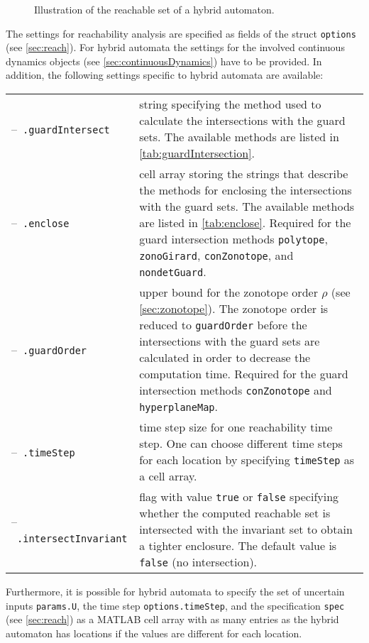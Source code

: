\begin{figure}[htb]
    \centering
    \caption{Illustration of the reachable set of a hybrid automaton.}
    \label{fig_hybridReachIllustration}
\end{figure}

The settings for reachability analysis are specified as fields of the struct \texttt{options} (see \cref{sec:reach}). For hybrid automata the settings for the involved continuous dynamics objects (see \cref{sec:continuousDynamics})
have to be provided. In addition, the following settings specific to hybrid automata are available:

\begin{center}
    \renewcommand{\arraystretch}{1.3}
    \begin{tabular}[t]{l p{10cm}}
        --~\texttt{.guardIntersect}     & string specifying the method used to calculate the intersections with the guard sets. The available methods are listed in \cref{tab:guardIntersection}.                                                                                                                                                                       \\
        --~\texttt{.enclose}            & cell array storing the strings that describe the methods for enclosing the intersections with the guard sets. The available methods are listed in \cref{tab:enclose}. Required for the guard intersection methods \texttt{polytope}, \texttt{zonoGirard}, \texttt{conZonotope}, and \texttt{nondetGuard}.                     \\
        --~\texttt{.guardOrder}         & upper bound for the zonotope order $\rho$ (see \cref{sec:zonotope}). The zonotope order is reduced to \texttt{guardOrder} before the intersections with the guard sets are calculated in order to decrease the computation time. Required for the guard intersection methods \texttt{conZonotope} and \texttt{hyperplaneMap}. \\
        --~\texttt{.timeStep}           & time step size for one reachability time step. One can choose different time steps for each location by specifying \texttt{timeStep} as a cell array.                                                                                                                                                                             \\
        --~\texttt{.intersectInvariant} & flag with value \texttt{true} or \texttt{false} specifying whether the computed reachable set is intersected with the invariant set to obtain a tighter enclosure. The default value is \texttt{false} (no intersection).
    \end{tabular}
\end{center}
Furthermore, it is possible for hybrid automata to specify the set of uncertain inputs \texttt{params.U}, the time step \texttt{options.timeStep}, and the specification \texttt{spec} (see \cref{sec:reach}) as a MATLAB cell array with as many entries as the hybrid automaton has locations if the values are different for each location.

